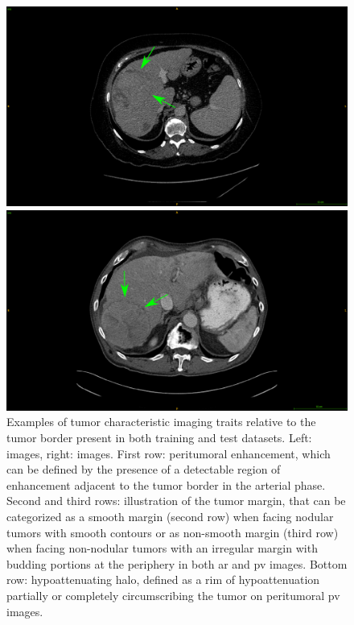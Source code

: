 \begin{figure}[!ht]
\begin{minipage}{0.45\linewidth}
	\end{minipage} \\
	\begin{minipage}{0.45\linewidth}
		\includegraphics[width=\linewidth]{../Contributions/images/ImagingTraits/ResizeGDB_halo}
	\end{minipage} \hspace{-0.1cm}
	\begin{minipage}{0.45\linewidth}
		\includegraphics[width=\linewidth]{../Contributions/images/ImagingTraits/ResizeTCIA_halo}
	\end{minipage}
	\caption{Examples of tumor characteristic imaging traits relative to the tumor border present in both training and test datasets. Left: \textbf{} images, right: \textbf{} images. First row: peritumoral enhancement, which can be defined by the presence of a detectable region of enhancement adjacent to the tumor border in the arterial phase. Second and third rows: illustration of the tumor margin, that can be categorized as a smooth margin (second row) when facing nodular tumors with smooth contours or as non-smooth margin (third row) when facing non-nodular tumors with an irregular margin with budding portions at the periphery in both \ac{ar} and \ac{pv} images. Bottom row: hypoattenuating halo, defined as a rim of hypoattenuation partially or completely circumscribing the tumor on peritumoral \ac{pv} images. }
	\label{fig:InterDb_imagingTraits}
\end{figure}
